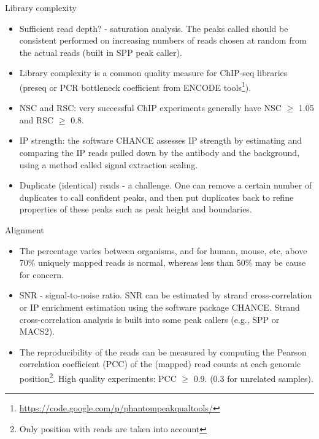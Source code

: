 \documentclass{beamer}
\begin{document}
\begin{frame}{Library complexity}
\begin{itemize}
\item Sufficient read depth? - saturation analysis. The peaks called should be consistent performed on increasing numbers of reads chosen at random from the actual reads (built in SPP peak caller).
\item Library complexity is a common quality measure for ChIP-seq libraries (preseq or PCR bottleneck coefficient from ENCODE tools\footnote{\url{https://code.google.com/p/phantompeakqualtools/}}).
\item NSC and RSC: very successful ChIP experiments generally have NSC $\geq$ 1.05 and RSC $\geq$ 0.8.
\item IP strength: the software CHANCE assesses IP strength by estimating and comparing the IP reads pulled down by the antibody and the background, using a method called signal extraction scaling.
\item Duplicate (identical) reads - a challenge. One can remove a certain number of duplicates to call confident peaks, and then put duplicates back to refine properties of these peaks such as peak height and boundaries.
\end{itemize}

\end{frame}
\begin{frame}{Alignment}
\begin{itemize}
\item The percentage varies between organisms, and for human, mouse, etc, above 70\% uniquely mapped reads is normal, whereas less than 50\% may be cause for concern.
\item SNR - signal-to-noise ratio. SNR can be estimated by strand cross-correlation or IP enrichment estimation using the software package CHANCE. Strand cross-correlation analysis is built into some peak callers (e.g., SPP or MACS2).
\item The reproducibility of the reads can be measured by computing the Pearson correlation coefficient (PCC) of the (mapped) read counts at each genomic position\footnote{Only position with reads are taken into account}. High quality experiments: PCC $\geq$ 0.9. (0.3 for unrelated samples).
\end{itemize}
\end{frame}
\end{document}
